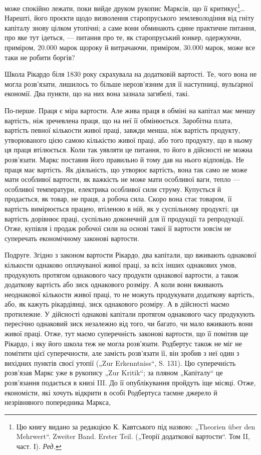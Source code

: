 \parcont{}  %
може спокійно лежати, поки вийде друком рукопис Марксів, що її критикує\footnote*{
Цю книгу видано за редакцією К. Кавтського під назвою: „Theorien über den Mehrwert“. Zweiter
Band. Erster Teil. („Теорії додаткової вартости“. Том II, част. І). \emph{Ред.}
}\dots{} Нарешті, його проєкти
щодо визволення старопруського землеволодіння від гніту капіталу знову цілком утопічні; а саме вони
обминають єдине практичне питання, про яке тут ідеться, — питання про те, як старопруський юнкер,
одержуючи, приміром, 20.000 марок щороку й витрачаючи, приміром, 30.000 марок, може все таки не
робити боргів?

Школа Рікардо біля 1830 року скрахувала на додатковій вартості. Те, чого вона не могла розв’язати,
лишилось то більше нерозв’язним для її наступниці, вульґарної економії. Два пункти, що на них вона
зазнала загибелі, такі.

По-перше. Праця є міра вартости. Але жива праця в обміні на капітал має меншу вартість, ніж
зречевлена праця, що на неї її обмінюється. Заробітна плата, вартість певної кількости живої праці,
завжди менша, ніж вартість продукту, утворюваного цією самою кількістю живої праці, або того
продукту, що в ньому ця праця втілюється. Коли
так уявляти це питання, то його в дійсності не можна розв’язати. Маркс поставив його правильно й
тому дав на нього відповідь. Не праця має вартість. Як діяльність, що утворює вартість, вона так
само не може мати особливої вартости, як важкість не може мати особливої ваги, тепло — особливої
температури, електрика особливої сили струму. Купується й продається, як товар, не праця, а робоча
сила. Скоро вона стає товаром, її вартість вимірюється працею, втіленою в ній, як у суспільному
продукті; ця вартість дорівнює праці, суспільно доконечній для її продукції та репродукції. Отже,
купівля і продаж робочої сили на основі такої її вартости зовсім не суперечать економічному законові
вартости.

Подруге. Згідно з законом вартости Рікардо, два капітали, що вживають однакової кількости однаково
оплачуваної живої праці, за всіх інших однакових умов, продукують протягом однакового часу продукти
однакової вартости, а також додаткову вартість або зиск однакового розміру. А коли вони вживають
неоднакової кількости живої праці, то не можуть продукувати додаткову вартість, або, як кажуть
рікардіянці, зиск однакового розміру. А в дійсності маємо протилежне. У дійсності однакові
капітали протягом однакового часу продукують пересічно однаковий зиск незалежно від того, чи багато,
чи мало вживають вони живої праці. Отже, тут маємо суперечність законові вартости, що її помітив ще
Рікардо, і яку його школа теж не могла розв’язати. Родбертус також не міг не помітити цієї
суперечности, але замість розв’язати її, він зробив з неї один з вихідних пунктів своєї утопії („Zur
Erkenntniss“, S. 131). Цю суперечність розв’язав Маркс уже в рукопису „Zur Kritik“; за пляном
„Капіталу“ це розв’язання подається в книзі III. До її опублікування пройдуть іще місяці. Отже,
економісти, які хочуть відкрити в особі Родбертуса таємне джерело й незрівняного попередника Маркса,
\parbreak{}  %
